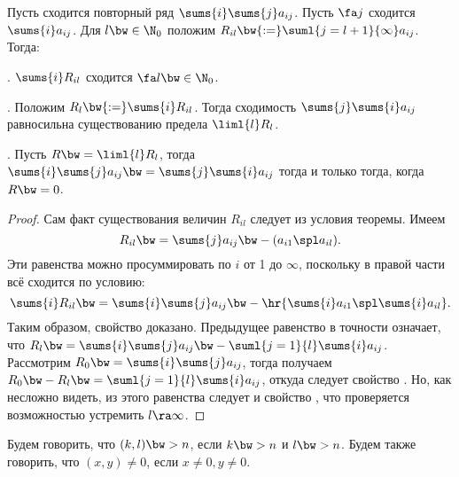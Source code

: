 \documentclass[a4paper]{article}
\begin{document}
\begin{theorem}[Маркова]
Пусть сходится повторный ряд $\sums{i}\sums{j} a_{ij}$. Пусть $\fa j$ сходится $\sums{i} a_{ij}$.
Для $l \bw\in \N_0$ положим $R_{il} \bw{:=} \suml{j=l+1}{\infty} a_{ij}$.
Тогда:

. $\sums{i} R_{il}$ сходится $\fa l \bw\in \N_0$.

. Положим $R_l \bw{:=} \sums{i} R_{il}$. Тогда сходимость $\sums{j}\sums{i} a_{ij}$
равносильна существованию предела $\liml{l} R_l$.

. Пусть $R \bw= \liml{l} R_l$, тогда $\sums{i}\sums{j}a_{ij} \bw= \sums{j}\sums{i} a_{ij}$
тогда и только тогда, когда $R \bw= 0$.
\end{theorem}
\begin{proof}
Сам факт существования величин $R_{il}$ следует из условия теоремы. Имеем
$$R_{il} \bw= \sums{j} a_{ij} \bw- (a_{i1}\spl a_{il}).$$
Эти равенства можно просуммировать по $i$ от 1 до $\infty$, поскольку в правой части всё сходится по условию:
$$\sums{i} R_{il} \bw= \sums{i} \sums{j} a_{ij} \bw- \hr{\sums{i}a_{i1}\spl \sums{i}a_{il}}.$$
Таким образом, свойство  доказано. Предыдущее равенство в точности означает, что
$R_l \bw= \sums{i}\sums{j}a_{ij} \bw- \suml{j=1}{l}\sums{i} a_{ij}$.
Рассмотрим $R_0 \bw= \sums{i}\sums{j} a_{ij}$, тогда получаем
$R_0 \bw- R_l \bw= \suml{j=1}{l}\sums{i}a_{ij}$, откуда следует
свойство . Но, как несложно видеть, из этого равенства следует и свойство , что
проверяется возможностью устремить $l \ra \infty$.
\end{proof}

\begin{df}
Будем говорить, что $(k, l) \bw> n$, если $k \bw> n$ и $l \bw> n$. Будем также говорить,
что $(x,y) \neq 0$, если $x \neq 0, y \neq 0$.
\end{df}
\end{document}
